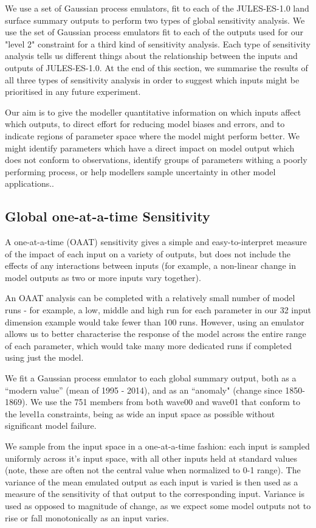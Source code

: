 \documentclass[gmd, manuscript]{copernicus}
\begin{document}
We use a set of Gaussian process emulators, fit to each of the JULES-ES-1.0 land surface summary outputs to perform two types of global sensitivity analysis. We use the set of Gaussian process emulators fit to each of the outputs used for our "level 2" constraint for a third kind of sensitivity analysis. Each type of sensitivity analysis tells us different things about the relationship between the inputs and outputs of JULES-ES-1.0. At the end of this section, we summarise the results of all three types of sensitivity analysis in order to suggest which inputs might be prioritised in any future experiment.

Our aim is to give the modeller quantitative information on which inputs affect which outputs, to direct effort for reducing model biases and errors, and to indicate regions of parameter space where the model might perform better. We might identify parameters which have a direct impact on model output which does not conform to observations, identify groups of parameters withing a poorly performing process, or help modellers sample uncertainty in other model applications..

\subsection{Global one-at-a-time Sensitivity}\label{ssec:sa_oaat}

A one-at-a-time (OAAT) sensitivity gives a simple and easy-to-interpret measure of the impact of each input on a variety of outputs, but does not include the effects of any interactions between inputs (for example, a non-linear change in model outputs as two or more inputs vary together).  

An OAAT analysis can be completed with a relatively small number of model runs - for example, a low, middle and high run for each parameter in our 32 input dimension example would take fewer than 100 runs. However, using an emulator allows us to better characterise the response of the model across the entire range of each parameter, which would take many more dedicated runs if completed using just the model.

We fit a Gaussian process emulator to each global summary output, both as a ``modern value'' (mean of 1995 - 2014), and as an ``anomaly" (change since 1850-1869). We use the 751 members from both wave00 and wave01 that conform to the level1a constraints, being as wide an input space as possible without significant model failure.

We sample from the input space in a one-at-a-time fashion: each input is sampled uniformly across it's input space, with all other inputs held at standard values (note, these are often not the central value when normalized to 0-1 range). The variance of the mean emulated output as each input is varied is then used as a measure of the sensitivity of that output to the corresponding input. Variance is used as opposed to magnitude of change, as we expect some model outputs not to rise or fall monotonically as an input varies.
\end{document}
